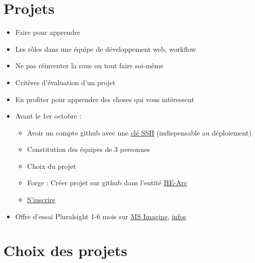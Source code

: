 \hypertarget{projets}{%
\section{Projets}\label{projets}}

\begin{itemize}
\tightlist
\item
  Faire pour apprendre
\item
  Les rôles dans une équipe de développement web, workflow
\item
  Ne pas réinventer la roue ou tout faire soi-même
\item
  Critères d'évaluation d'un projet
\item
  En profiter pour apprendre des choses qui vous intéressent
\item
  Avant le 1er octobre :

  \begin{itemize}
  \tightlist
  \item
    Avoir un compte github avec une
    \href{https://github.com/settings/keys}{clé SSH} (indispensable au
    déploiement)
  \item
    Constitution des équipes de 3 personnes
  \item
    Choix du projet
  \item
    Forge : Créer projet sur github dans l'entité
    \href{https://github.com/HE-Arc/}{HE-Arc}
  \item
    \href{https://github.com/HE-Arc/slides-devweb/wiki/Projets-2020-2021}{S'inscrire}
  \end{itemize}
\item
  Offre d'essai Pluralsight 1-6 mois sur
  \href{https://my.visualstudio.com/Benefits}{MS Imagine},
  \href{https://docs.microsoft.com/fr-fr/visualstudio/subscriptions/vs-pluralsight}{infos}
\end{itemize}

\hypertarget{choix-des-projets}{%
\section{Choix des projets}\label{choix-des-projets}}


